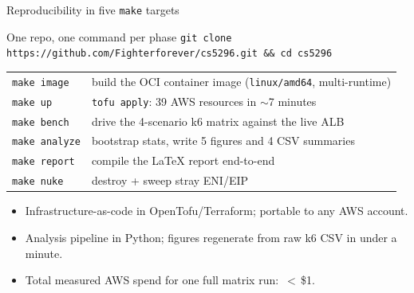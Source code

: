 \documentclass[aspectratio=169,11pt]{beamer}
\begin{document}
\begin{frame}{Reproducibility in five \texttt{make} targets}
  \vspace{4pt}
  \begin{block}{One repo, one command per phase}
    \texttt{git clone https://github.com/Fighterforever/cs5296.git \&\& cd cs5296}\\[4pt]
    \begin{tabular}{ll}
      \texttt{make image}    & build the OCI container image (\texttt{linux/amd64}, multi-runtime) \\
      \texttt{make up}       & \texttt{tofu apply}: 39 AWS resources in $\sim$7 minutes \\
      \texttt{make bench}    & drive the 4-scenario k6 matrix against the live ALB \\
      \texttt{make analyze}  & bootstrap stats, write 5 figures and 4 CSV summaries \\
      \texttt{make report}   & compile the LaTeX report end-to-end \\
      \texttt{make nuke}     & destroy + sweep stray ENI/EIP \\
    \end{tabular}
  \end{block}

  \vspace{4pt}
  \begin{itemize}\setlength\itemsep{2pt}
    \item Infrastructure-as-code in OpenTofu/Terraform; portable to any AWS account.
    \item Analysis pipeline in Python; figures regenerate from raw k6 CSV in under a minute.
    \item Total measured AWS spend for one full matrix run: \,$<$\,\$1.
  \end{itemize}
\end{frame}
\end{document}
